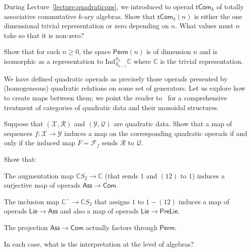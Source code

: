 \begin{question} 
During Lecture~\ref{lecture:quadraticops}, we introduced to operad $\mathsf{tCom}_k$ of totally
associative commutative $k$-ary algebras.
Show that $\mathsf{tCom}_k(n)$ is either the one dimensional trivial
representation or zero depending on $n$. What values must
$n$ take so that it is non-zero? 
\end{question}

\begin{question}
Show that for each $n\geqslant 0$, the space $\mathsf{Perm}(n)$ is of dimension $n$ and is
isomorphic as a representation to $\mathrm{Ind}_{S_{n-1}}^{S_n}\mathbb{C}$
where $\mathbb{C}$ is the trivial representation.
\end{question}



We have defined quadratic operads as precisely those
operads presented by (homogeneous) quadratic relations
on some set of generators. Let us explore how to create
maps between them; we point the reader to~\cite{Vallette2020a}
for a comprehensive treatment of categories of quadratic
data and their monoidal structures.

\begin{question}
Suppose that $(\mathcal{X},\mathcal{R})$ and $(\mathcal{Y},\mathcal Q)$
are quadratic data. Show that a
map of sequences $f: \mathcal{X} \longrightarrow \mathcal{Y}$
induces a map on the corresponding quadratic operads if and only if
the induced map $F = \mathcal{F}_f$ sends $\mathcal{R}$ to
$\mathcal{Q}$.
\end{question}

\begin{question}
Show that:
\begin{tenumerate}
\item The augmentation map
$\mathbb C S_2\longrightarrow \mathbb C$ (that
sends $1$ and $(12)$ to $1$) induces a surjective map of
operads $\mathsf{Ass}
\longrightarrow \mathsf{Com}$.
\item The inclusion map
$\mathbb{C}^- \longrightarrow \mathbb{C}S_2$ that assigns $1$ to 
$1-(12)$ induces a map of operads $\mathsf{Lie}\longrightarrow 
\mathsf{Ass}$ and also a map of operads $\mathsf{Lie}\longrightarrow 
\mathsf{PreLie}$.
\item The projection $\mathsf{Ass}
\longrightarrow \mathsf{Com}$ actually factors
through $\mathsf{Perm}$. 
\end{tenumerate}
In each case, what is the interpretation at the level
of algebras?
\end{question}
